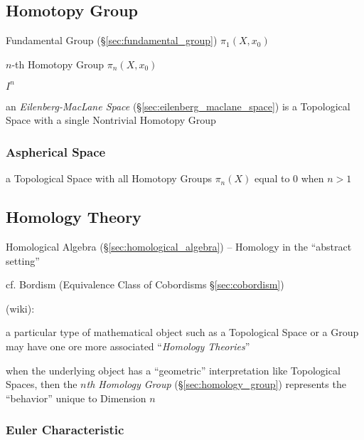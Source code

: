 \subsection{Homotopy Group}\label{sec:homotopy_group}

Fundamental Group (\S\ref{sec:fundamental_group}) $\pi_1(X,x_0)$

$n$-th Homotopy Group $\pi_n(X,x_0)$

$I^n$

an \emph{Eilenberg-MacLane Space} (\S\ref{sec:eilenberg_maclane_space}) is a
Topological Space with a single Nontrivial Homotopy Group



\subsubsection{Aspherical Space}\label{sec:aspherical_space}

a Topological Space with all Homotopy Groups $\pi_n(X)$ equal to $0$ when $n >
1$



\subsection{Homology Theory}\label{sec:homology_theory}

\fist Homological Algebra (\S\ref{sec:homological_algebra}) -- Homology in the
``abstract setting''

cf. Bordism (Equivalence Class of Cobordisms \S\ref{sec:cobordism})

(wiki):

a particular type of mathematical object such as a Topological Space or a
Group may have one ore more associated ``\emph{Homology Theories}''

when the underlying object has a ``geometric'' interpretation like Topological
Spaces, then the \emph{$n$th Homology Group} (\S\ref{sec:homology_group})
represents the ``behavior'' unique to Dimension $n$



\subsubsection{Euler Characteristic}\label{sec:euler_characteristic}

